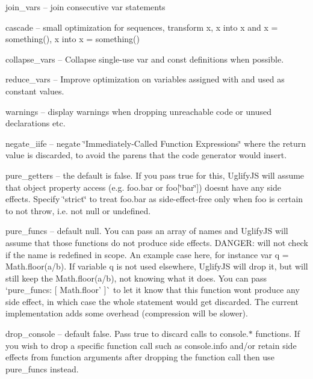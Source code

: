 \begin{DoxyItemize}
\item {\ttfamily join\+\_\+vars} -- join consecutive {\ttfamily var} statements
\item {\ttfamily cascade} -- small optimization for sequences, transform {\ttfamily x, x} into {\ttfamily x} and {\ttfamily x = something(), x} into {\ttfamily x = something()}
\item {\ttfamily collapse\+\_\+vars} -- Collapse single-\/use {\ttfamily var} and {\ttfamily const} definitions when possible.
\item {\ttfamily reduce\+\_\+vars} -- Improve optimization on variables assigned with and used as constant values.
\item {\ttfamily warnings} -- display warnings when dropping unreachable code or unused declarations etc.
\item {\ttfamily negate\+\_\+iife} -- negate \char`\"{}\+Immediately-\/\+Called Function Expressions\char`\"{} where the return value is discarded, to avoid the parens that the code generator would insert.
\item {\ttfamily pure\+\_\+getters} -- the default is {\ttfamily false}. If you pass {\ttfamily true} for this, Uglify\+JS will assume that object property access (e.\+g. {\ttfamily foo.\+bar} or {\ttfamily foo\mbox{[}\char`\"{}bar\char`\"{}\mbox{]}}) doesn\textquotesingle{}t have any side effects. Specify {\ttfamily \char`\"{}strict\char`\"{}} to treat {\ttfamily foo.\+bar} as side-\/effect-\/free only when {\ttfamily foo} is certain to not throw, i.\+e. not {\ttfamily null} or {\ttfamily undefined}.
\item {\ttfamily pure\+\_\+funcs} -- default {\ttfamily null}. You can pass an array of names and Uglify\+JS will assume that those functions do not produce side effects. D\+A\+N\+G\+ER\+: will not check if the name is redefined in scope. An example case here, for instance {\ttfamily var q = Math.\+floor(a/b)}. If variable {\ttfamily q} is not used elsewhere, Uglify\+JS will drop it, but will still keep the {\ttfamily Math.\+floor(a/b)}, not knowing what it does. You can pass `pure\+\_\+funcs\+: \mbox{[} \textquotesingle{}Math.\+floor' \mbox{]}\`{} to let it know that this function won\textquotesingle{}t produce any side effect, in which case the whole statement would get discarded. The current implementation adds some overhead (compression will be slower).
\item {\ttfamily drop\+\_\+console} -- default {\ttfamily false}. Pass {\ttfamily true} to discard calls to {\ttfamily console.$\ast$} functions. If you wish to drop a specific function call such as {\ttfamily console.\+info} and/or retain side effects from function arguments after dropping the function call then use {\ttfamily pure\+\_\+funcs} instead.

\end{DoxyItemize}
